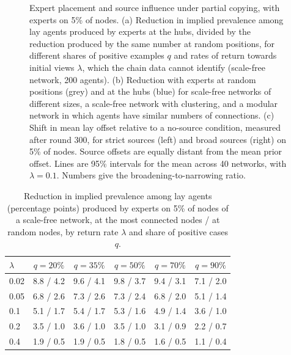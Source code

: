 \begin{figure}[htbp]
\centering
\resizebox{0.92\textwidth}{!}{\figrobust}
\caption{Expert placement and source influence under partial copying, with experts on 5\% of nodes. (a) Reduction in implied prevalence among lay agents produced by experts at the hubs, divided by the reduction produced by the same number at random positions, for different shares of positive examples $q$ and rates of return towards initial views $\lambda$, which the chain data cannot identify (scale-free network, 200 agents). (b) Reduction with experts at random positions (grey) and at the hubs (blue) for scale-free networks of different sizes, a scale-free network with clustering, and a modular network in which agents have similar numbers of connections. (c) Shift in mean lay offset relative to a no-source condition, measured after round 300, for strict sources (left) and broad sources (right) on 5\% of nodes. Source offsets are equally distant from the mean prior offset. Lines are 95\% intervals for the mean across 40 networks, with $\lambda=0.1$. Numbers give the broadening-to-narrowing ratio.}
\label{fig:robust}
\end{figure}

\begin{table}[htbp]
\centering
\caption{Reduction in implied prevalence among lay agents (percentage points) produced by experts on 5\% of nodes of a scale-free network, at the most connected nodes / at random nodes, by return rate $\lambda$ and share of positive cases $q$.}
\label{tab:sens}
\begingroup\small\setlength{\tabcolsep}{3.5pt}
\begin{tabular}{lccccc}
\toprule
$\lambda$ & $q=20\%$ & $q=35\%$ & $q=50\%$ & $q=70\%$ & $q=90\%$ \\
\midrule
0.02 & 8.8 / 4.2 & 9.6 / 4.1 & 9.8 / 3.7 & 9.4 / 3.1 & 7.1 / 2.0 \\
0.05 & 6.8 / 2.6 & 7.3 / 2.6 & 7.3 / 2.4 & 6.8 / 2.0 & 5.1 / 1.4 \\
0.1 & 5.1 / 1.7 & 5.4 / 1.7 & 5.3 / 1.6 & 4.9 / 1.4 & 3.6 / 1.0 \\
0.2 & 3.5 / 1.0 & 3.6 / 1.0 & 3.5 / 1.0 & 3.1 / 0.9 & 2.2 / 0.7 \\
0.4 & 1.9 / 0.5 & 1.9 / 0.5 & 1.8 / 0.5 & 1.6 / 0.5 & 1.1 / 0.4 \\
\bottomrule
\end{tabular}\endgroup
\end{table}

